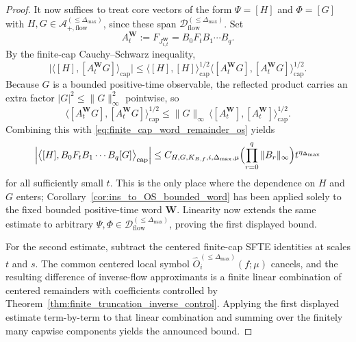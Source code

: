 \begin{proof}
It now suffices to treat core vectors of the form $\Psi=[H]$ and $\Phi=[G]$ with
$H,G\in\mathcal A^{(\le \Delta_{\max})}_{+,\mathrm{flow}}$, since these span
$\mathcal D^{(\le \Delta_{\max})}_{\mathrm{flow}}$.
Set
\[
A_t^{\mathbf W}:=F_{J_{i,t}^{\mathbf W}}=B_0F_tB_1\cdots B_q.
\]
By the finite-cap Cauchy--Schwarz inequality,
\[
\Big|
\big\langle [H],[A_t^{\mathbf W}G]\big\rangle_{\mathrm{cap}}
\Big|
\le
\big\langle [H],[H]\big\rangle_{\mathrm{cap}}^{1/2}
\big\langle [A_t^{\mathbf W}G],[A_t^{\mathbf W}G]\big\rangle_{\mathrm{cap}}^{1/2}.
\]
Because $G$ is a bounded positive-time observable, the reflected product carries an extra factor $|G|^2\le \|G\|_\infty^2$ pointwise, so
\[
\big\langle [A_t^{\mathbf W}G],[A_t^{\mathbf W}G]\big\rangle_{\mathrm{cap}}^{1/2}
\le
\|G\|_\infty\,
\big\langle [A_t^{\mathbf W}],[A_t^{\mathbf W}]\big\rangle_{\mathrm{cap}}^{1/2}.
\]
Combining this with \eqref{eq:finite_cap_word_remainder_os} yields
\[
\Big|
\big\langle [H],B_0F_tB_1\cdots B_q[G]\big\rangle_{\mathrm{cap}}
\Big|
\le
C_{H,G,K_{B,f},i,\Delta_{\max},\mu}
\Bigl(\prod_{r=0}^q \|B_r\|_{\infty}\Bigr)
 t^{\eta_{\Delta_{\max}}}
\]
for all sufficiently small $t$.
This is the only place where the dependence on $H$ and $G$ enters; Corollary~\ref{cor:ins_to_OS_bounded_word} has been applied solely to the fixed bounded positive-time word $\mathbf W$.
Linearity now extends the same estimate to arbitrary
$\Psi,\Phi\in\mathcal D^{(\le \Delta_{\max})}_{\mathrm{flow}}$, proving the first displayed bound.

For the second estimate, subtract the centered finite-cap SFTE identities at scales $t$ and $s$.
The common centered local symbol $\widehat O_i^{(\le \Delta_{\max})}(f;\mu)$ cancels, and the resulting difference of inverse-flow approximants is a finite linear combination of centered remainders with coefficients controlled by Theorem~\ref{thm:finite_truncation_inverse_control}.
Applying the first displayed estimate term-by-term to that linear combination and summing over the finitely many capwise components yields the announced bound.
\end{proof}

